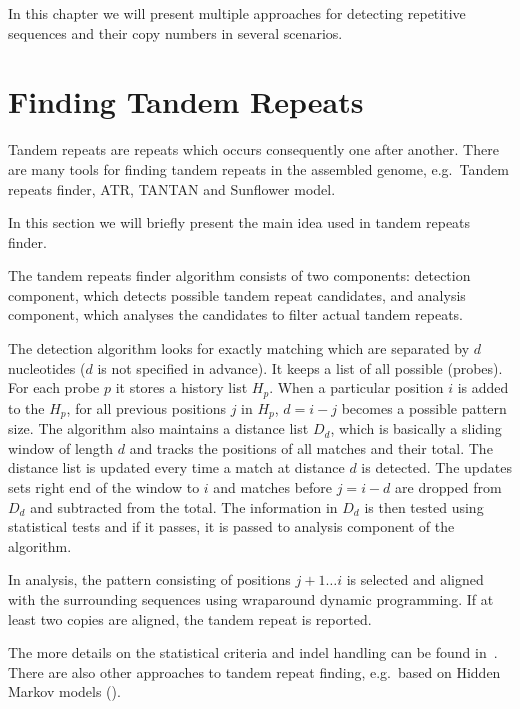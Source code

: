 In this chapter we will present multiple approaches for detecting repetitive sequences and their copy numbers in several scenarios.


\section{Finding Tandem Repeats}
Tandem repeats are repeats which occurs consequently one after another. There are many tools for finding tandem repeats in the assembled genome, e.g.\ Tandem repeats finder\cite{trf}, ATR\cite{atr}, TANTAN\cite{tantan} and Sunflower model\cite{nanasi2014probabilistic}.

In this section we will briefly present the main idea used in tandem repeats finder.

The tandem repeats finder algorithm consists of two components: detection component, which detects possible tandem repeat candidates, and analysis component, which analyses the candidates to filter actual tandem repeats.

The detection algorithm looks for exactly matching \kmers which are separated by $d$ nucleotides ($d$ is not specified in advance). It keeps a list of all possible \kmers (probes).
For each probe $p$ it stores a history list $H_p$.
When a particular position $i$ is added to the $H_p$, for all previous positions $j$ in $H_p$, $d = i - j$ becomes a possible pattern size.
The algorithm also maintains a distance list $D_d$, which is basically a sliding window of length $d$ and tracks the positions of all matches and their total. The distance list is updated every time a match at distance $d$ is detected. The updates sets right end of the window to $i$ and matches before $j = i - d$ are dropped from $D_d$ and subtracted from the total. The information in $D_d$ is then tested using statistical tests and if it passes, it is passed to analysis component of the algorithm.

In analysis, the pattern consisting of positions $j+1\dots i$ is selected and aligned with the surrounding sequences using wraparound dynamic programming\cite{fischetti1992apostolico, myers1989approximate}. If at least two copies are aligned, the tandem repeat is reported.

The more details on the statistical criteria and indel handling can be found in~\cite{trf}. There are also other approaches to tandem repeat finding, e.g.\ based on Hidden Markov models (\cite{tantan, nanasi2014probabilistic}).

